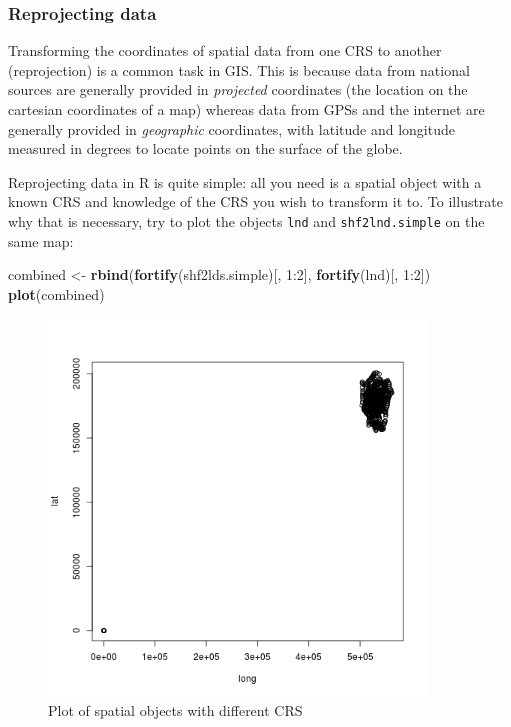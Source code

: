 \documentclass[]{article}
\newenvironment{Shaded}{}{}
\newcommand{\KeywordTok}[1]{\textcolor[rgb]{0.00,0.44,0.13}{\textbf{{#1}}}}
\newcommand{\DecValTok}[1]{\textcolor[rgb]{0.25,0.63,0.44}{{#1}}}
\newcommand{\NormalTok}[1]{{#1}}
\let\Oldincludegraphics\includegraphics
\renewcommand{\includegraphics}[1]{\Oldincludegraphics[width=10cm]{#1}}
\begin{document}
\subsubsection{Reprojecting data}

Transforming the coordinates of spatial data from one CRS to another
(reprojection) is a common task in GIS. This is because data from
national sources are generally provided in \emph{projected} coordinates
(the location on the cartesian coordinates of a map) whereas data from
GPSs and the internet are generally provided in \emph{geographic}
coordinates, with latitude and longitude measured in degrees to locate
points on the surface of the globe.

Reprojecting data in R is quite simple: all you need is a spatial object
with a known CRS and knowledge of the CRS you wish to transform it to.
To illustrate why that is necessary, try to plot the objects
\texttt{lnd} and \texttt{shf2lnd.simple} on the same map:

\begin{Shaded}
\begin{Highlighting}[]
\NormalTok{combined <- }\KeywordTok{rbind}\NormalTok{(}\KeywordTok{fortify}\NormalTok{(shf2lds.simple)[, }\DecValTok{1}\NormalTok{:}\DecValTok{2}\NormalTok{], }\KeywordTok{fortify}\NormalTok{(lnd)[, }\DecValTok{1}\NormalTok{:}\DecValTok{2}\NormalTok{])}
\KeywordTok{plot}\NormalTok{(combined)}
\end{Highlighting}
\end{Shaded}
\begin{figure}[htbp]
\centering
\includegraphics{figure/Plot_of_spatial_objects_with_different_CRS.png}
\caption{Plot of spatial objects with different CRS}
\end{figure}
\end{document}
